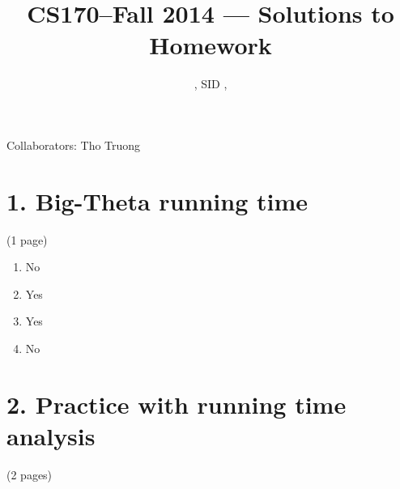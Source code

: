 \documentclass[11pt]{article}
\title{CS170--Fall 2014 --- Solutions to Homework \Homework}
\author{\Name, SID \SID, \texttt{\Login}}
\newenvironment{qparts}{\begin{enumerate}[{(}a{)}]}{\end{enumerate}}
\begin{document}
\maketitle

\noindent
Collaborators: Tho Truong


\section*{1. Big-Theta running time} (1 page)
\begin{qparts}
\Large{}
\item
No
\item
Yes
\item
Yes
\item
No
\end{qparts}

\newpage
\section*{2. Practice with running time analysis} (2 pages)
\end{document}
